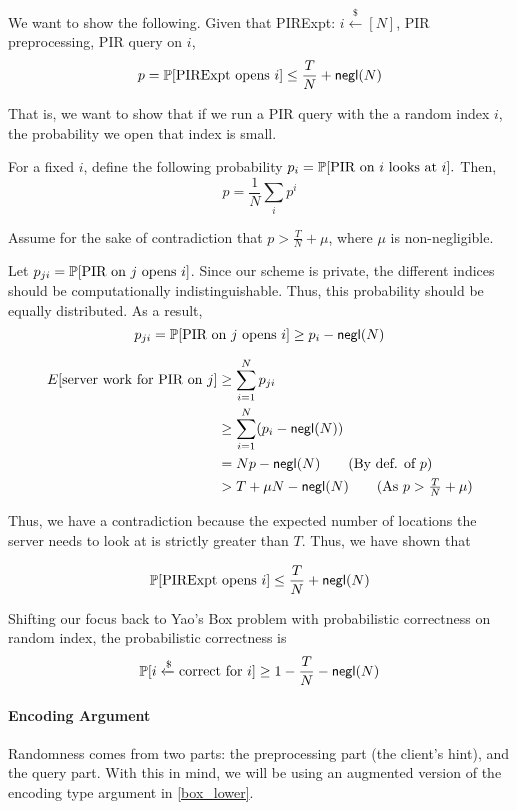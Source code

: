 We want to show the following. Given that PIRExpt: $i \xleftarrow{\$} [N]$, PIR preprocessing, PIR query on $i$,
\[p =\mathbb{P}[\text{PIRExpt opens $i$}] \le \frac{T}{N} + {\sf negl}(N)\]

That is, we want to show that if we run a PIR query with the a random index $i$, the probability we open that index is small.

For a fixed $i$, define the following probability $p_i = \mathbb{P}[\text{PIR on $i$ looks at $i$}].$ Then, 
\[p =\frac{1}{N} \sum_i p^i\]

Assume for the sake of contradiction that  $p > \frac{T}{N} + \mu$, where $\mu$ is non-negligible.

Let $p_{ji} = \mathbb{P}[\text{PIR on $j$ opens $i$}]$. Since our scheme is private, the different indices should be computationally indistinguishable. Thus, this probability should be equally distributed. As a result,
\[p_{ji} = \mathbb{P}[\text{PIR on $j$ opens $i$}] \ge p_i - {\sf negl}(N)\]

\begin{align*}
    E[\text{server work for PIR on $j$}] &\ge \sum_{i=1}^N p_{ji} \\
    &\ge \sum_{i=1}^N (p_{i} - \negl(N))\\
    &= Np - \negl(N) \tag{By def. of $p$}\\
    &> T + \mu N - \negl(N) \tag{As $p > \frac{T}{N} + \mu$}\\ 
\end{align*}

Thus, we have a contradiction because the expected number of locations the server needs to look at is strictly greater than $T$. Thus, we have shown that 

\[\mathbb{P}[\text{PIRExpt opens $i$}] \le \frac{T}{N} + {\sf negl}(N)\]

\vspace{5mm}

Shifting our focus back to Yao's Box problem with probabilistic correctness on random index, the probabilistic correctness is
\[\mathbb{P}[i \xleftarrow{\$} \text{correct for $i$}] \ge 1 - \frac{T}{N} - {\sf negl}(N)\]

\paragraph{Encoding Argument}
Randomness comes from two parts: the preprocessing part (the client's hint), and the query part. With this in mind, we will be using an augmented version of the encoding type argument in \ref{box_lower}.

